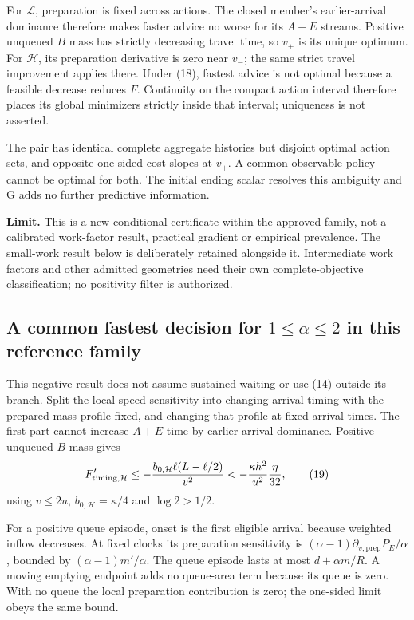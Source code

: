 \documentclass[11pt,a4paper]{article}
\begin{document}
For $\mathcal L$, preparation is fixed across actions. The closed member's
earlier-arrival dominance therefore makes faster advice no worse for its
$A+E$ streams. Positive unqueued $B$ mass has strictly decreasing travel
time, so $v_+$ is its unique optimum.
For $\mathcal H$, its preparation derivative is zero near $v_-$; the same
strict travel improvement applies there. Under (18), fastest advice is not
optimal because a feasible decrease reduces $F$. Continuity on the compact
action interval therefore places its global minimizers strictly inside that
interval; uniqueness is not asserted.

The pair has identical complete aggregate histories but disjoint optimal
action sets, and opposite one-sided cost slopes at $v_+$. A common observable
policy cannot be optimal for both. The initial ending scalar resolves this
ambiguity and G adds no further predictive information.

\textbf{Limit.} This is a new conditional certificate within the approved
family, not a calibrated work-factor result, practical gradient or empirical
prevalence. The small-work result below is deliberately retained alongside it.
Intermediate work factors and other admitted geometries need their own
complete-objective classification; no positivity filter is authorized.

\subsection*{A common fastest decision for $1\leq\alpha\leq2$ in this reference family}
This negative result does not assume sustained waiting or use (14) outside
its branch. Split the local speed sensitivity into changing arrival timing
with the prepared mass profile fixed, and changing that profile at fixed
arrival times. The first part cannot increase $A+E$ time by earlier-arrival
dominance. Positive unqueued $B$ mass gives
\[
 F'_{{\rm timing},\mathcal H}\leq
 -\frac{b_{0,\mathcal H}\ell(L-\ell/2)}{v^2}
 <-\frac{\kappa h^2}{u^2}\frac{\eta}{32},
 \tag{19}
\]
using $v\leq2u$, $b_{0,\mathcal H}=\kappa/4$ and $\log2>1/2$.

For a positive queue episode, onset is the first eligible arrival because
weighted inflow decreases. At fixed clocks its preparation sensitivity is
$(\alpha-1)\partial_{v,\mathrm{prep}}P_E/\alpha$, bounded by
$(\alpha-1)m'/\alpha$. The queue episode lasts at most
$d+\alpha m/R$. A moving emptying endpoint adds no queue-area term
because its queue is zero. With no queue the local preparation contribution
is zero; the one-sided limit obeys the same bound.
\end{document}
